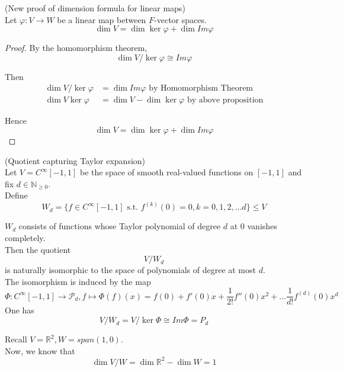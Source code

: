 \begin{corollary}
    (New proof of dimension formula for linear maps)  \\
    
    Let $\varphi: V \to W$ be a linear map between $F$-vector spaces. \\
    \[
        \dim V = \dim \ker{\varphi} + \dim Im\varphi
    \]
\end{corollary}
\begin{proof}
    By the homomorphism theorem, 
    \[
        \dim V /\ker{\varphi} \cong Im \varphi
    \]

    Then 
    \begin{align*}
        \dim V / \ker{\varphi} &= \dim Im \varphi \text{ by Homomorphism Theorem}\\
        \dim V \ker{\varphi} &= \dim V - \dim \ker{\varphi} \text{ by above proposition}
    \end{align*}

    Hence
    \[
        \dim V = \dim \ker{\varphi} + \dim Im\varphi
    \]
\end{proof}

\begin{example}
    (Quotient capturing Taylor expansion) \\

    Let $V = C^{\infty}[-1, 1]$ be the space of smooth real-valued functions on $[-1, 1]$ and fix $d \in \mathbb{N}_{\geq 0}$. \\

    Define 
    \[
        W_d = \{ f \in C^{\infty}[-1, 1] \text{ s.t. }  f^{(k)} (0) = 0, k = 0, 1, 2, \hdots d \}  \leq V
    \]


    $W_d$ consists of functions whose Taylor polynomial of degree $d$ at 0 vanishes completely. \\

    Then the quotient 
    \[
        V /W_{d}
    \]
    is naturally isomorphic to the space of polynomials of degree at most $d$. \\

    The isomorphism is induced by the map 
    \[
        \Phi: C^{\infty}[-1, 1] \to \mathcal{P}_d, f \mapsto \Phi(f)(x) = f(0) + f'(0) x + \frac{1}{2!} f''(0) x^2 + \hdots \frac{1}{d!}f^{(d)} (0)  x^d
    \]
    One has 
    \[
        V / W_d = V /\ker{\Phi} \cong Im \Phi = P_d
    \]
\end{example}

\begin{example}
    Recall $V = \mathbb{R}^2, W = span{(1, 0)}$. \\

    Now, we know that 
    \[
        \dim V /W = \dim \mathbb{R}^2 - \dim W = 1
    \]
\end{example}

